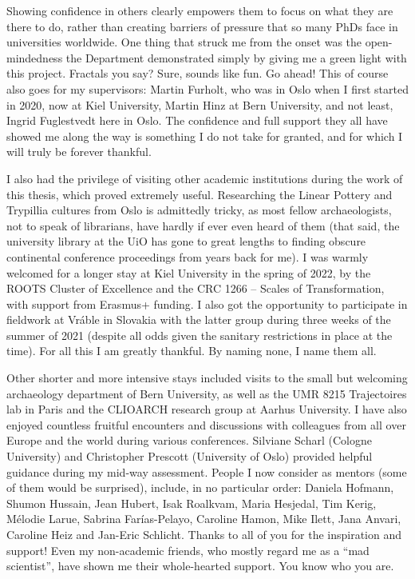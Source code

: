 \documentclass[
  12pt,
  a4paper, twoside]{book}
\begin{document}
Showing confidence in others clearly empowers them to focus on what they are there to do, rather than creating barriers of pressure that so many PhDs face in universities worldwide. One thing that struck me from the onset was the open-mindedness the Department demonstrated simply by giving me a green light with this project. Fractals you say? Sure, sounds like fun. Go ahead! This of course also goes for my supervisors: Martin Furholt, who was in Oslo when I first started in 2020, now at Kiel University, Martin Hinz at Bern University, and not least, Ingrid Fuglestvedt here in Oslo. The confidence and full support they all have showed me along the way is something I do not take for granted, and for which I will truly be forever thankful.

I also had the privilege of visiting other academic institutions during the work of this thesis, which proved extremely useful. Researching the Linear Pottery and Trypillia cultures from Oslo is admittedly tricky, as most fellow archaeologists, not to speak of librarians, have hardly if ever even heard of them (that said, the university library at the UiO has gone to great lengths to finding obscure continental conference proceedings from years back for me). I was warmly welcomed for a longer stay at Kiel University in the spring of 2022, by the ROOTS Cluster of Excellence and the CRC 1266 -- Scales of Transformation, with support from Erasmus+ funding. I also got the opportunity to participate in fieldwork at Vráble in Slovakia with the latter group during three weeks of the summer of 2021 (despite all odds given the sanitary restrictions in place at the time). For all this I am greatly thankful. By naming none, I name them all.

Other shorter and more intensive stays included visits to the small but welcoming archaeology department of Bern University, as well as the UMR 8215 Trajectoires lab in Paris and the CLIOARCH research group at Aarhus University. I have also enjoyed countless fruitful encounters and discussions with colleagues from all over Europe and the world during various conferences. Silviane Scharl (Cologne University) and Christopher Prescott (University of Oslo) provided helpful guidance during my mid-way assessment. People I now consider as mentors (some of them would be surprised), include, in no particular order: Daniela Hofmann, Shumon Hussain, Jean Hubert, Isak Roalkvam, Maria Hesjedal, Tim Kerig, Mélodie Larue, Sabrina Farías-Pelayo, Caroline Hamon, Mike Ilett, Jana Anvari, Caroline Heiz and Jan-Eric Schlicht. Thanks to all of you for the inspiration and support! Even my non-academic friends, who mostly regard me as a ``mad scientist'', have shown me their whole-hearted support. You know who you are.
\end{document}
